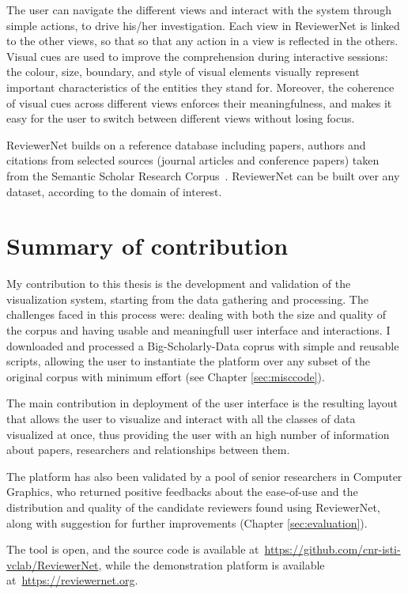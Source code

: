 The user can navigate the different views and interact with the system through simple actions, to drive his/her investigation. Each view in ReviewerNet is linked to the other views, so that so that any action in a view is reflected in the others. Visual cues are used to improve the comprehension during interactive sessions: the colour, size, boundary, and style of visual elements visually represent important characteristics of the entities they stand for. Moreover, the coherence of visual cues across different views enforces their meaningfulness, and makes it easy for the user to switch between different views without losing focus.  

ReviewerNet builds on a reference database including papers, authors and citations from selected sources (journal articles and conference papers) taken from the Semantic Scholar Research Corpus~\cite{ammar:18}. ReviewerNet can be built over any dataset, according to the domain of interest.

\section{Summary of contribution}

My contribution to this thesis is the development and validation of the visualization system, starting from the data gathering and processing. The challenges faced in this process were: dealing with both the size and quality of the corpus and having usable and meaningfull user interface and interactions. I downloaded and processed a Big-Scholarly-Data coprus with simple and reusable scripts, allowing the user to instantiate the platform over any subset of the original corpus with minimum effort (see Chapter \ref{sec:misccode}). 

The main contribution in deployment of the user interface is the resulting layout that allows the user to visualize and interact with all the classes of data visualized at once, thus providing the user with an high number of information about papers, researchers and relationships between them.

The platform has also been validated by a pool of senior researchers in Computer Graphics, who returned positive feedbacks about the ease-of-use and the distribution and quality of the candidate reviewers found using ReviewerNet, along with suggestion for further improvements (Chapter \ref{sec:evaluation}). 

The tool is open, and the source code is available at~\url{https://github.com/cnr-isti-vclab/ReviewerNet}, while the demonstration platform is available at~\url{https://reviewernet.org}.
